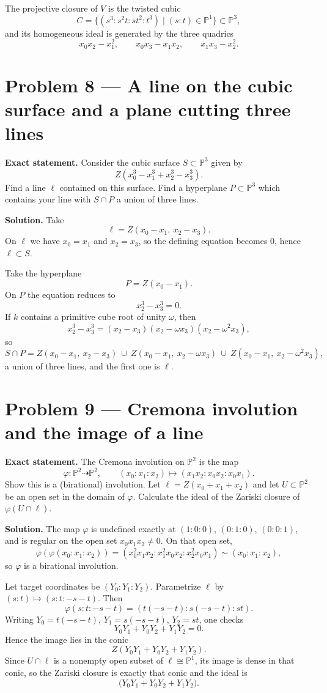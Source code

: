 \documentclass[12pt,a4paper]{article}
\theoremstyle{plain}
\theoremstyle{definition}      %
\begin{document}
The projective closure of $V$ is the twisted cubic
\[
C=\{(s^3:s^2t:st^2:t^3)\mid (s:t)\in \mathbb{P}^1\}\subset \mathbb{P}^3,
\]
and its homogeneous ideal is generated by the three quadrics
\[
x_0x_2-x_1^2,\qquad x_0x_3-x_1x_2,\qquad x_1x_3-x_2^2.
\]

\section*{Problem 8 — A line on the cubic surface and a plane cutting three lines}

\textbf{Exact statement.}
Consider the cubic surface $S\subset \mathbb{P}^3$ given by
\[
Z(x_0^3-x_1^3+x_2^3-x_3^3).
\]
Find a line $\ell$ contained on this surface.
Find a hyperplane $P\subset \mathbb{P}^3$ which contains your line with $S\cap P$ a union of three lines.

\textbf{Solution.}
Take
\[
\ell=Z(x_0-x_1,\ x_2-x_3).
\]
On $\ell$ we have $x_0=x_1$ and $x_2=x_3$, so the defining equation becomes $0$, hence $\ell\subset S$.

Take the hyperplane
\[
P=Z(x_0-x_1).
\]
On $P$ the equation reduces to
\[
x_2^3-x_3^3=0.
\]
If $k$ contains a primitive cube root of unity $\omega$, then
\[
x_2^3-x_3^3=(x_2-x_3)(x_2-\omega x_3)(x_2-\omega^2 x_3),
\]
so
\[
S\cap P
=
Z(x_0-x_1,\ x_2-x_3)
\ \cup\
Z(x_0-x_1,\ x_2-\omega x_3)
\ \cup\
Z(x_0-x_1,\ x_2-\omega^2 x_3),
\]
a union of three lines, and the first one is $\ell$.

\section*{Problem 9 — Cremona involution and the image of a line}

\textbf{Exact statement.}
The Cremona involution on $\mathbb{P}^2$ is the map
\[
\varphi:\mathbb{P}^2\dashrightarrow\mathbb{P}^2,
\qquad
(x_0:x_1:x_2)\mapsto (x_1x_2:x_0x_2:x_0x_1).
\]
Show this is a (birational) involution.
Let $\ell=Z(x_0+x_1+x_2)$ and let $U\subset \mathbb{P}^2$ be an open set in the domain of $\varphi$.
Calculate the ideal of the Zariski closure of $\varphi(U\cap \ell)$.

\textbf{Solution.}
The map $\varphi$ is undefined exactly at $(1:0:0)$, $(0:1:0)$, $(0:0:1)$, and is regular on the open set $x_0x_1x_2\neq 0$.
On that open set,
\[
\varphi(\varphi(x_0:x_1:x_2))
=
(x_0^2x_1x_2:x_1^2x_0x_2:x_2^2x_0x_1)
\sim
(x_0:x_1:x_2),
\]
so $\varphi$ is a birational involution.

Let target coordinates be $(Y_0:Y_1:Y_2)$.
Parametrize $\ell$ by $(s:t)\mapsto (s:t:-s-t)$.
Then
\[
\varphi(s:t:-s-t)=(t(-s-t):s(-s-t):st).
\]
Writing $Y_0=t(-s-t)$, $Y_1=s(-s-t)$, $Y_2=st$, one checks
\[
Y_0Y_1+Y_0Y_2+Y_1Y_2=0.
\]
Hence the image lies in the conic
\[
Z(Y_0Y_1+Y_0Y_2+Y_1Y_2).
\]
Since $U\cap \ell$ is a nonempty open subset of $\ell\cong \mathbb{P}^1$, its image is dense in that conic, so the Zariski closure is exactly that conic and the ideal is
\[
\bigl(Y_0Y_1+Y_0Y_2+Y_1Y_2\bigr).
\]
\end{document}
